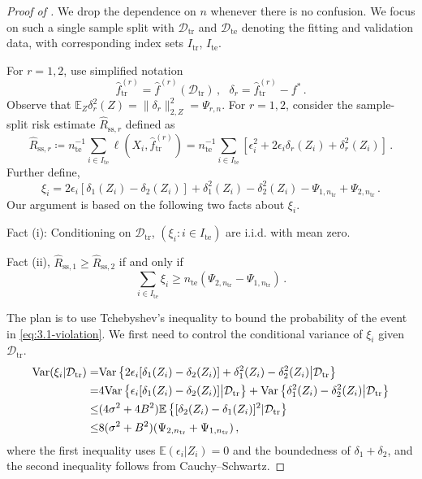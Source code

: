 \documentclass[11pt]{article}
\theoremstyle{plain}
\newcommand{\ssp}{{\mathrm{ss}}}
\newcommand{\tr}{{\mathrm{tr}}}
\newcommand{\te}{{\mathrm{te}}}
\newcommand{\D}{{\mathcal{D}}}
\begin{document}
\begin{proof}[Proof of ]
We drop the dependence on $n$ whenever there is no confusion.
    We focus on such a single sample split with $\D_\tr$ and $\D_\te$ denoting the fitting and validation data, with corresponding index sets $I_\tr$, $I_\te$.   

For $r=1,2$, use simplified notation
$$\hat f_{\tr}^{(r)}=\hat f^{(r)}(\D_\tr)\,,~~~ \delta_r=\hat f_{\tr}^{(r)}-f^*\,.$$
Observe that $\mathbb E_Z \delta_r^2(Z)=\|\delta_r\|_{2,Z}^2=\Psi_{r,n}$.
For $r=1,2$,
consider the sample-split risk estimate $\hat R_{\ssp,r}$ defined as
\begin{equation}\label{eq:3.1-r_ss}\hat R_{\ssp, r}\coloneqq n_\te^{-1}\sum_{i\in I_\te}\ell(X_i,\hat f_{\tr}^{(r)})= n_\te^{-1}\sum_{i\in I_\te} \left[\epsilon_i^2 + 2\epsilon_i \delta_r(Z_i) +\delta_r^2(Z_i)\right]\,.
\end{equation}
Further define,
$$
\xi_i = 2\epsilon_i[\delta_1(Z_i)-\delta_2(Z_i)]+\delta_1^2(Z_i)-\delta_2^2(Z_i)-\Psi_{1,n_\tr} + \Psi_{2,n_\tr}\,.
$$
Our argument is based on the following two facts about $\xi_i$.

Fact (i): Conditioning on $\D_\tr$, $(\xi_i:i\in I_\te)$ are i.i.d. with mean zero.

Fact (ii), $\hat R_{\ssp,1}\ge \hat R_{\ssp,2}$ if and only if
\begin{equation}\label{eq:3.1-violation}
    \sum_{i\in I_\te} \xi_i \ge n_\te (\Psi_{2,n_\tr}-\Psi_{1,n_\tr})\,.
\end{equation}

The plan is to use Tchebyshev's inequality to bound the probability of the event in \eqref{eq:3.1-violation}. We first need to control the conditional variance of $\xi_i$ given $\D_\tr$.  
\begin{align}
    {\rm Var}(\xi_i|\D_\tr) = & {\rm Var}\left\{2\epsilon_i[\delta_1(Z_i)-\delta_2(Z_i)]+\delta_1^2(Z_i)-\delta_2^2(Z_i)\big|\D_\tr\right\}\nonumber\\
    = & 4 {\rm Var}\left\{\epsilon_i[\delta_1(Z_i)-\delta_2(Z_i)]\big|\D_\tr\right\}+{\rm Var}\left\{\delta_1^2(Z_i)-\delta_2^2(Z_i)\big|\D_\tr\right\}\nonumber\\
    \le & (4 \sigma^2+4B^2)\mathbb E\left\{[\delta_2(Z_i)-\delta_1(Z_i)]^2|\D_\tr\right\}\nonumber\\
    \le & 8(\sigma^2+B^2) (\Psi_{2,n_\tr}+\Psi_{1,n_\tr})\,,\label{eq:3.1-cond-var-bound}
\end{align}
where the first inequality uses $\mathbb E(\epsilon_i|Z_i)=0$ and the boundedness of $\delta_1+\delta_2$, and the second inequality follows from Cauchy–Schwartz.


\end{proof}
\end{document}
